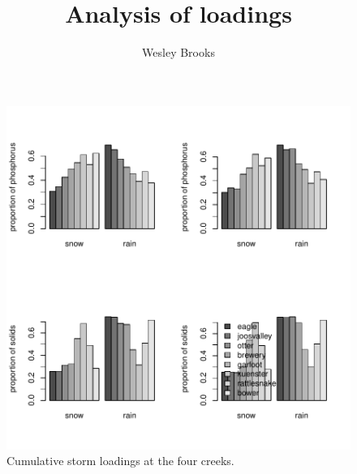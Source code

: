 \documentclass[10pt]{article}
\title{Analysis of loadings}
\author{Wesley Brooks}
\date{}                                           %
\begin{document}

\maketitle



















\begin{figure}[h!]
    \begin{center}
\includegraphics{loadings-fig2}
    \end{center}
    \vspace{-10mm}
    \caption{Cumulative storm loadings at the four creeks.\label{bars}}
\end{figure}
\end{document}

